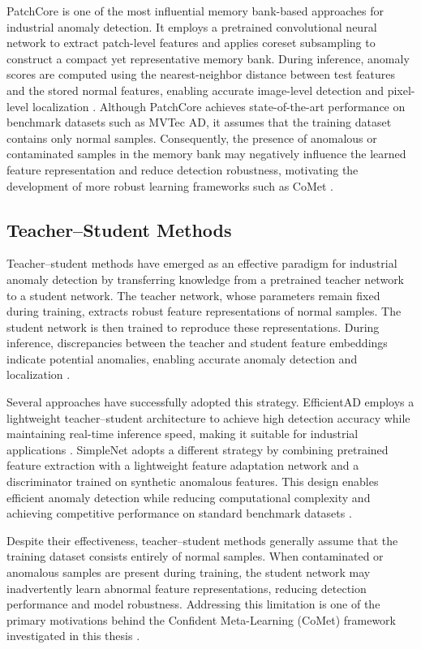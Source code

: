 \documentclass[12pt,openany,oneside]{book}
\begin{document}
PatchCore is one of the most influential memory bank-based approaches for industrial anomaly detection. It employs a pretrained convolutional neural network to extract patch-level features and applies coreset subsampling to construct a compact yet representative memory bank. During inference, anomaly scores are computed using the nearest-neighbor distance between test features and the stored normal features, enabling accurate image-level detection and pixel-level localization \cite{roth2022patchcore}. Although PatchCore achieves state-of-the-art performance on benchmark datasets such as MVTec AD, it assumes that the training dataset contains only normal samples. Consequently, the presence of anomalous or contaminated samples in the memory bank may negatively influence the learned feature representation and reduce detection robustness, motivating the development of more robust learning frameworks such as CoMet \cite{aqeel2025comet}.

\subsection{Teacher--Student Methods}

Teacher--student methods have emerged as an effective paradigm for industrial anomaly detection by transferring knowledge from a pretrained teacher network to a student network. The teacher network, whose parameters remain fixed during training, extracts robust feature representations of normal samples. The student network is then trained to reproduce these representations. During inference, discrepancies between the teacher and student feature embeddings indicate potential anomalies, enabling accurate anomaly detection and localization \cite{batzner2024efficientad,liu2024survey}.

Several approaches have successfully adopted this strategy. EfficientAD employs a lightweight teacher--student architecture to achieve high detection accuracy while maintaining real-time inference speed, making it suitable for industrial applications \cite{batzner2024efficientad}. SimpleNet adopts a different strategy by combining pretrained feature extraction with a lightweight feature adaptation network and a discriminator trained on synthetic anomalous features. This design enables efficient anomaly detection while reducing computational complexity and achieving competitive performance on standard benchmark datasets \cite{liu2023simplenet}.

Despite their effectiveness, teacher--student methods generally assume that the training dataset consists entirely of normal samples. When contaminated or anomalous samples are present during training, the student network may inadvertently learn abnormal feature representations, reducing detection performance and model robustness. Addressing this limitation is one of the primary motivations behind the Confident Meta-Learning (CoMet) framework investigated in this thesis \cite{aqeel2025comet}.
\end{document}
